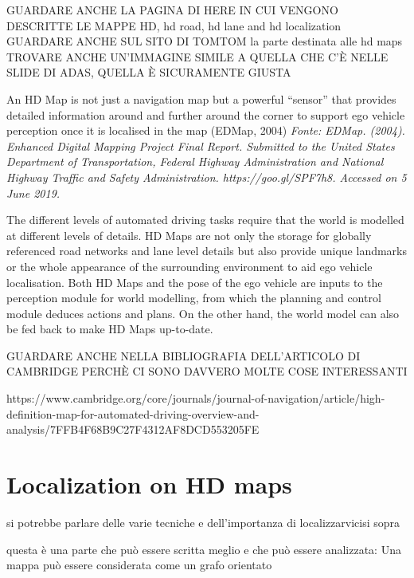 GUARDARE ANCHE LA PAGINA DI HERE IN CUI VENGONO DESCRITTE LE MAPPE HD, hd road, hd lane and hd localization 
GUARDARE ANCHE SUL SITO DI TOMTOM la parte destinata alle hd maps 
TROVARE ANCHE UN'IMMAGINE SIMILE A QUELLA CHE C'È NELLE SLIDE DI ADAS, QUELLA È SICURAMENTE GIUSTA 



An HD Map is not just a navigation map
but a powerful “sensor” that provides detailed information around and further around the
corner to support ego vehicle perception once it is localised in the map (EDMap, 2004)
\textit{Fonte: EDMap. (2004). Enhanced Digital Mapping Project Final Report. Submitted to the United States Department
of Transportation, Federal Highway Administration and National Highway Traffic and Safety Administration.
https://goo.gl/SPF7h8. Accessed on 5 June 2019.}


The different levels of automated driving tasks require that the world is modelled at
different levels of details. HD Maps are not only the storage for globally referenced road
networks and lane level details but also provide unique landmarks or the whole appearance
of the surrounding environment to aid ego vehicle localisation. Both HD Maps and the
pose of the ego vehicle are inputs to the perception module for world modelling, from
which the planning and control module deduces actions and plans. On the other hand, the
world model can also be fed back to make HD Maps up-to-date.

GUARDARE ANCHE NELLA BIBLIOGRAFIA DELL'ARTICOLO DI CAMBRIDGE PERCHÈ CI SONO DAVVERO MOLTE COSE INTERESSANTI

https://www.cambridge.org/core/journals/journal-of-navigation/article/high-definition-map-for-automated-driving-overview-and-analysis/7FFB4F68B9C27F4312AF8DCD553205FE



\section{Localization on HD maps}

si potrebbe parlare delle varie tecniche e dell'importanza di localizzarvicisi sopra

questa è una parte che può essere scritta meglio e che può essere analizzata: Una mappa può essere considerata come un grafo orientato 

